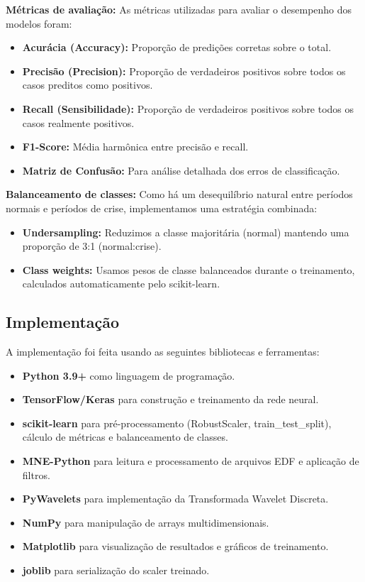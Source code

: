 \documentclass[12pt,a4paper]{article}
\begin{document}
\textbf{Métricas de avaliação:} As métricas utilizadas para avaliar o desempenho dos modelos foram:
\begin{itemize}
    \item \textbf{Acurácia (Accuracy):} Proporção de predições corretas sobre o total.
    \item \textbf{Precisão (Precision):} Proporção de verdadeiros positivos sobre todos os casos preditos como positivos.
    \item \textbf{Recall (Sensibilidade):} Proporção de verdadeiros positivos sobre todos os casos realmente positivos.
    \item \textbf{F1-Score:} Média harmônica entre precisão e recall.
    \item \textbf{Matriz de Confusão:} Para análise detalhada dos erros de classificação.
\end{itemize}

\textbf{Balanceamento de classes:} Como há um desequilíbrio natural entre períodos normais e períodos de crise, implementamos uma estratégia combinada:
\begin{itemize}
    \item \textbf{Undersampling:} Reduzimos a classe majoritária (normal) mantendo uma proporção de 3:1 (normal:crise).
    \item \textbf{Class weights:} Usamos pesos de classe balanceados durante o treinamento, calculados automaticamente pelo scikit-learn.
\end{itemize}

\subsection{Implementação}

A implementação foi feita usando as seguintes bibliotecas e ferramentas:

\begin{itemize}
    \item \textbf{Python 3.9+} como linguagem de programação.
    \item \textbf{TensorFlow/Keras} para construção e treinamento da rede neural.
    \item \textbf{scikit-learn} para pré-processamento (RobustScaler, train\_test\_split), cálculo de métricas e balanceamento de classes.
    \item \textbf{MNE-Python} para leitura e processamento de arquivos EDF e aplicação de filtros.
    \item \textbf{PyWavelets} para implementação da Transformada Wavelet Discreta.
    \item \textbf{NumPy} para manipulação de arrays multidimensionais.
    \item \textbf{Matplotlib} para visualização de resultados e gráficos de treinamento.
    \item \textbf{joblib} para serialização do scaler treinado.
\end{itemize}
\end{document}
